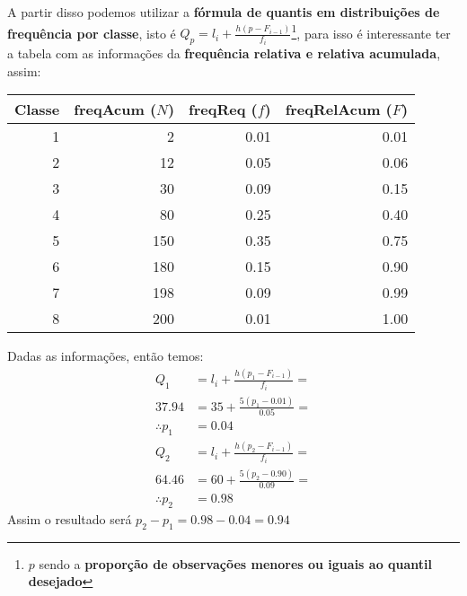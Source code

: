 \begin{parts}
\begin{solution}
        A partir disso podemos utilizar a \textbf{fórmula de quantis em distribuições de frequência por classe}, isto é $Q_p = l_i + \frac{h(p - F_{i - 1})}{f_i}$\footnote{$p$ sendo a \textbf{proporção de observações menores ou iguais ao quantil desejado}}, para isso é interessante ter a tabela com as informações da \textbf{frequência relativa e relativa acumulada}, assim:

        \begin{table}[H]
            \centering
            \begin{tabular}{rrrr}
                \hline
                Classe & freqAcum ($N$) & freqReq ($f$) & freqRelAcum ($F$) \\
                \hline
                1      & 2              & 0.01          & 0.01              \\
                2      & 12             & 0.05          & 0.06              \\
                3      & 30             & 0.09          & 0.15              \\
                4      & 80             & 0.25          & 0.40              \\
                5      & 150            & 0.35          & 0.75              \\
                6      & 180            & 0.15          & 0.90              \\
                7      & 198            & 0.09          & 0.99              \\
                8      & 200            & 0.01          & 1.00              \\
                \hline
            \end{tabular}
        \end{table}

        Dadas as informações, então temos:
        \begin{equation*}
            \begin{split}
                Q_1            & = l_i + \frac{h(p_1 - F_{i-1})}{f_i} = \\
                37.94          & = 35 + \frac{5(p_1 - 0.01)}{0.05} =    \\
                \therefore p_1 & = 0.04
            \end{split}
        \end{equation*}
        \begin{equation*}
            \begin{split}
                Q_2            & = l_i + \frac{h(p_2 - F_{i-1})}{f_i} = \\
                64.46          & = 60 + \frac{5(p_2 - 0.90)}{0.09} =    \\
                \therefore p_2 & = 0.98
            \end{split}
        \end{equation*}
        Assim o resultado será $p_2 - p_1 = 0.98 - 0.04 = 0.94$
    \end{solution}
    \ifprintanswers
        \spewnotes
    \fi


\end{parts}